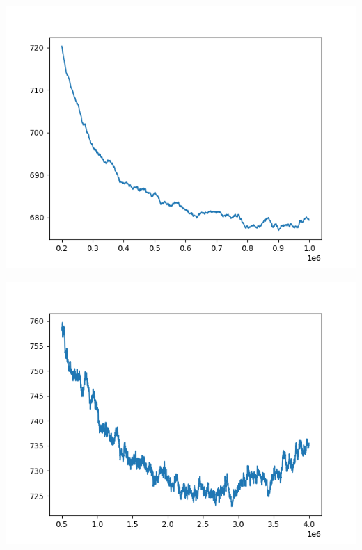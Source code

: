 \documentclass{article}
\begin{document}
\begin{enumerate}[label=\arabic*.]
\begin{minipage}{0.49\linewidth}
            \includegraphics[width=\linewidth]{../starter_code/figs/sgd_wo_k_80.png}
        \end{minipage}\hfill
        \begin{minipage}{0.49\linewidth}
            \includegraphics[width=\linewidth]{../starter_code/figs/sgd_k80.png}
        \end{minipage}\hfill
        \begin{minipage}{0.49\linewidth}

\end{minipage}
\end{enumerate}
\end{document}

